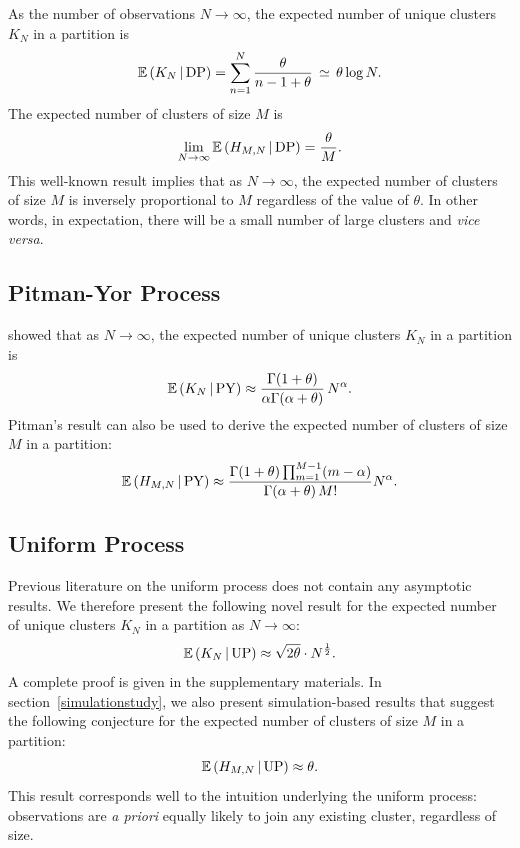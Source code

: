 \documentclass[twoside]{article}
\begin{document}
As the number of observations $N \to \infty$, the expected number of
unique clusters $K_N$ in a partition is
\begin{equation}
\mathbb{E}\,(K_N\,|\,{\rm DP}) = \sum_{n = 1}^N \frac{\theta}{n -
  1 + \theta}  \,\simeq\, \theta \log N. \label{DPmom2}
\end{equation}
The expected number of clusters of size $M$ is
\begin{equation}
\lim_{N \to \infty} \mathbb{E}\,(H_{M,N}\,|\,{\rm DP}) = 
\frac{\theta}{M}.\label{DPmom1}
\end{equation}
This well-known result \cite[]{ArrBarTav03} implies that as $N \to
\infty$, the expected number of clusters of size $M$ is inversely
proportional to $M$ regardless of the value of $\theta$. In other
words, in expectation, there will be a small number of large clusters
and \emph{vice versa}.

\subsection{Pitman-Yor Process} \label{PY_asymptotic}

\cite{Pit02} showed that as $N \to \infty$, the expected number of
unique clusters $K_N$ in a partition is
\begin{equation}
\mathbb{E}\,(K_N \,|\,{\rm PY}) \approx \frac{\Gamma(1 + \theta)}{
  \alpha\Gamma(\alpha +
\theta)} \,N^{\alpha}. \label{PYmom2}
\end{equation}
Pitman's result can also be used to derive the expected number of
clusters of size $M$ in a partition:
\begin{equation}
\mathbb{E}\,(H_{M,N} \,|\,{\rm PY}) \approx \frac{\Gamma(1 +
  \theta) \prod_{m=1}^{M-1} (m - \alpha)}{\Gamma(\alpha +
\theta)\,  M!} N^{\alpha}.  \label{PYmom4}
\end{equation}

\subsection{Uniform Process}\label{UN_asymptotic}

Previous literature on the uniform process does not contain any
asymptotic results. We therefore present the following novel result
for the expected number of unique clusters $K_N$ in a partition as $N
\to \infty$:
\begin{equation}
\mathbb{E}\,(K_N\,|\,{\rm UP}) \approx \sqrt{2 \theta} \cdot
N^{\frac{1}{2}}. \label{UNmom2}
\end{equation}
A complete proof is given in the supplementary materials. In
section~\ref{simulationstudy}, we also present simulation-based
results that suggest the following conjecture for the expected number
of clusters of size $M$ in a partition:
\begin{equation}
\mathbb{E}\,(H_{M,N} \,|\, {\rm UP}) \approx \theta.  \label{UNmom4}
\end{equation}
This result corresponds well to the intuition underlying the uniform
process: observations are \emph{a priori} equally likely to join any
existing cluster, regardless of size.
\end{document}
